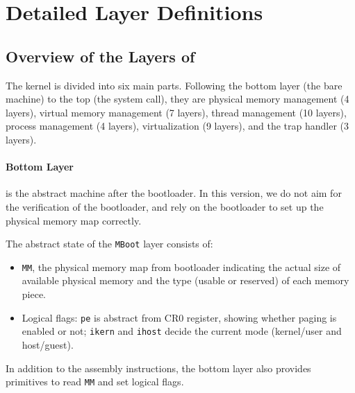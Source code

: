 \section{Detailed Layer Definitions}
\label{sec:layers}

\subsection{Overview of the Layers of \mCTOS{}}
\label{sec:spec:layer}
  
The \mCTOS{} kernel is divided into six main parts.
Following the bottom layer (the bare machine) to the top (the system call),
they are physical memory management (4 layers), virtual memory management (7 layers), thread management (10
layers), process management (4
layers), virtualization (9 layers), and the trap handler (3 layers).


\paragraph{Bottom Layer} is the abstract machine after the bootloader.
In this version, we do not aim for the verification of the bootloader,
and rely on the bootloader to set up the physical memory
map correctly.

The abstract state of the \verb+MBoot+ layer consists of:
\begin{itemize}
\item \verb"MM", the physical memory map from bootloader
indicating the actual size
  of available physical memory and the type (usable or reserved) of
  each memory piece.
\item Logical flags: \verb"pe" is abstract from CR0 register, showing
  whether paging is enabled or not; \verb"ikern" and \verb"ihost"
  decide the current mode (kernel/user and host/guest).
\end{itemize}

In addition to the assembly instructions, the bottom layer also provides primitives to read \verb"MM" and set logical flags.
 
